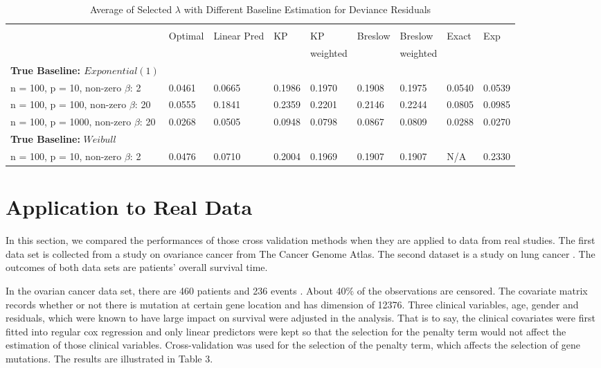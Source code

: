 \begin{table}[h]
	\small
	\caption{Average of Selected $\lambda$ with Different Baseline Estimation for Deviance Residuals}
	\centering
	\begin{tabular}{lllllllll}
	\hline
	\\[-0.75em]
    & Optimal & Linear Pred & KP & KP & Breslow & Breslow & Exact & Exp\\ 
    &  & & & weighted & & weighted & & \\ \cline{2 - 9} 
	\textbf{True Baseline: $Exponential(1)$} &&&&&&&&\\
	n = 100, p = 10, non-zero $\beta$: 2 & 0.0461 & 0.0665 & 0.1986 & 0.1970 & 0.1908 & 0.1975 & 0.0540 & 0.0539 \\
	n = 100, p = 100, non-zero $\beta$: 20 &0.0555 & 0.1841 & 0.2359 & 0.2201 & 0.2146 & 0.2244 & 0.0805 & 0.0985 \\
	n = 100, p = 1000, non-zero $\beta$: 20 & 0.0268 & 0.0505 & 0.0948 & 0.0798 & 0.0867 & 0.0809 & 0.0288 & 0.0270 \\
	\textbf{True Baseline:} $Weibull$ &&&&&&&& \\
 	n = 100, p = 10, non-zero $\beta$: 2 & 0.0476 & 0.0710 & 0.2004 & 0.1969 & 0.1907 & 0.1907 & N/A & 0.2330 \\ 
	\hline
\end{tabular}
\end{table}

\section{Application to Real Data}

\par In this section, we compared the performances of those cross validation methods when they are applied to data from real studies. The first data set is collected from a study on ovariance cancer from The Cancer Genome Atlas. The second dataset is a study on lung cancer \citep{shedden2008gene}. The outcomes of both data sets are patients' overall survival time.

\par In the ovarian cancer data set, there are 460 patients and 236 events . About 40$\%$ of the observations are censored. The covariate matrix records whether or not there is mutation at certain gene location and has dimension of 12376. Three clinical variables, age, gender and residuals, which were known to have large impact on survival were adjusted in the analysis. That is to say, the clinical covariates were first fitted into regular cox regression and only linear predictors were kept so that the selection for the penalty term would not affect the estimation of those clinical variables. Cross-validation was used for the selection of the penalty term, which affects the selection of gene mutations. The results are illustrated in Table 3. 

